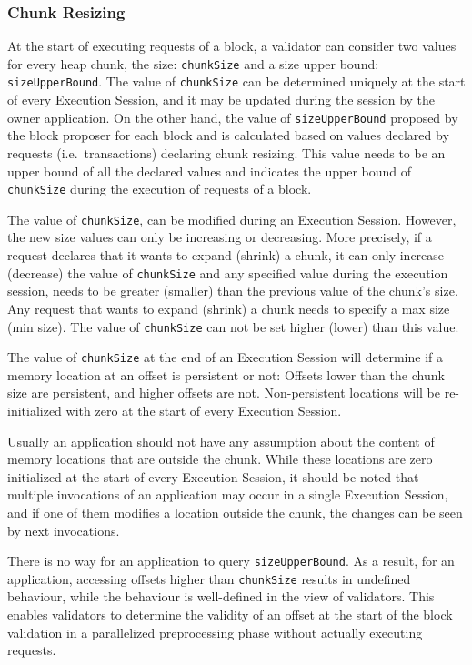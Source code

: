 \subsubsection{Chunk Resizing}\label{subsubsec:ch-resize}

At the start of executing requests of a block, a validator can consider two values for every
heap chunk, the size: \texttt{chunkSize} and a size upper bound: \texttt{sizeUpperBound}. The value of
\texttt{chunkSize} can be determined uniquely at the start of
every Execution Session, and it may be updated during the session by the owner application. On the other hand,
the value of \texttt{sizeUpperBound} proposed by the block proposer for each block and is calculated based on values
declared by requests (i.e.\ transactions) declaring chunk resizing. This value needs to be an upper bound of all the
declared values and indicates the upper bound of \texttt{chunkSize} during the execution of requests of a block.

The value of \texttt{chunkSize}, can be modified during an Execution Session. However, the new size values can only be
increasing or decreasing. More precisely, if a request declares that it wants to expand (shrink) a chunk, it can only
increase (decrease) the value of \texttt{chunkSize} and any specified value during the execution
session, needs to be greater (smaller) than the previous value of the chunk's size. Any request that wants to expand
(shrink) a chunk needs to specify a max size (min size). The value of \texttt{chunkSize} can not be set higher
(lower) than this value.

The value of \texttt{chunkSize} at the end of an Execution Session will determine if a memory location at an
offset is persistent or not: Offsets lower than the chunk size are persistent, and higher offsets are not.
Non-persistent locations will be re-initialized with zero at the start of every Execution Session.

Usually an application should not have any assumption about the content of memory locations that are outside the chunk.
While these locations are zero initialized at the start of every Execution Session, it should be noted that multiple
invocations of an application may occur in a single Execution Session, and if one of them modifies a location outside
the chunk, the changes can be seen by next invocations.

There is no way for an application to query \texttt{sizeUpperBound}. As a result, for an application,
accessing offsets higher than \texttt{chunkSize} results in undefined behaviour, while the behaviour is well-defined
in the view of validators.
This enables validators to determine the validity of an offset at the start of the block validation in a parallelized
preprocessing phase without actually executing requests.

